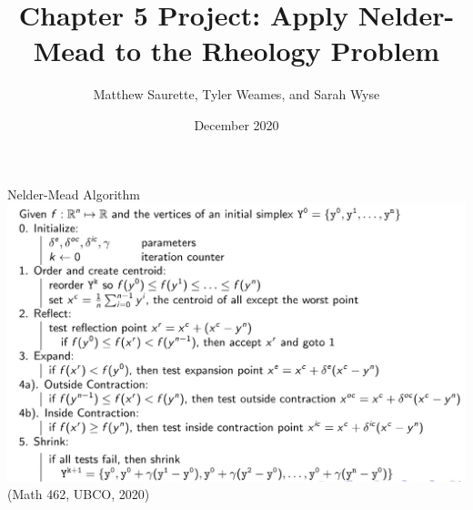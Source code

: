 \documentclass{beamer}
\title[Nelder-Mead on the Rheology Problem]{Chapter 5 Project: Apply Nelder-Mead to the Rheology Problem}
\author[Matthew, Tyler, and Sarah]{Matthew Saurette, Tyler Weames, and Sarah Wyse}
\institute[Math 462]{Math 462\\ University of British Columbia - Okanagan}
\date{December 2020}
\begin{document}
\maketitle

\begin{frame}{Nelder-Mead Algorithm}
    \centering
    \includegraphics[width=0.95\linewidth]{NMAlgorithm}\\
	\hfill \tiny (Math 462, UBCO, 2020) 
\end{frame}
\end{document}

